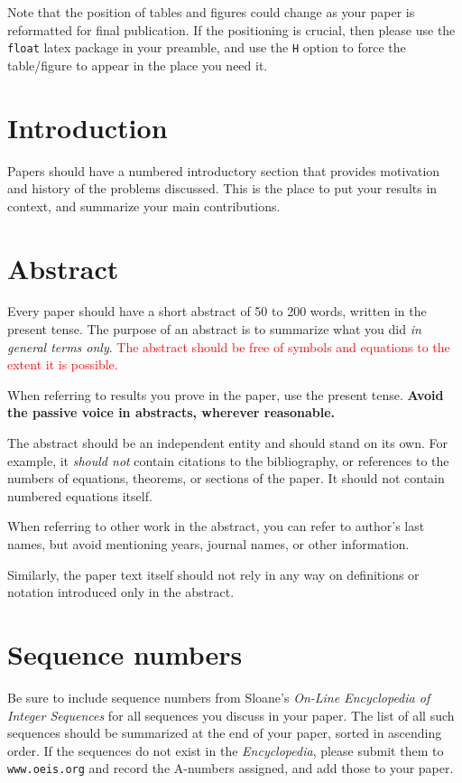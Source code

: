 \documentclass[12pt]{article}
\begin{document}
Note that the position of tables and figures could change as your paper
is reformatted for final publication.  If the positioning is crucial, then
please use the {\tt float} latex package in your preamble, and use the
{\tt H} option to force the table/figure to appear in the place you
need it.    

\section{Introduction}

Papers should have a numbered introductory section that provides motivation and
history of the problems discussed.  This is the place to put your results
in context, and summarize your main contributions.

\section{Abstract}

Every paper should have a short abstract of 50 to 200 words, written
in the present tense.  The purpose of an abstract is to summarize what
you did {\it in general terms only}.  
\textcolor{red}{The abstract
should be free of
symbols and equations to the extent it is possible.}

When referring to results you prove in the paper, use the present tense.  
\textbf{Avoid the passive voice in abstracts, wherever reasonable.}

The abstract should be an independent entity and should stand on its
own.  For example, it {\it should not\/} contain citations to the
bibliography, or references to the numbers of equations, theorems, or
sections of the paper.  It should not contain numbered equations
itself.   

When referring to other work in the abstract, you can refer to author's
last names, but avoid mentioning years, journal names, or other
information.

Similarly, the paper text itself should not rely in any way on definitions
or notation introduced only in the abstract.

\section{Sequence numbers}

Be sure to include sequence numbers from Sloane's {\it On-Line Encyclopedia
of Integer Sequences} for all sequences you discuss in your paper.
The list of all such sequences should be summarized at the end of your
paper, sorted in ascending order.    If the sequences do not exist in the
{\it Encyclopedia}, please submit them to {\tt www.oeis.org}
and record the A-numbers assigned,
and add those to your paper.
\end{document}
